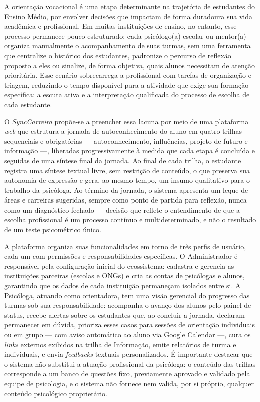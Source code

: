 A orientação vocacional é uma etapa determinante na trajetória de estudantes do Ensino Médio, por envolver decisões que impactam de forma duradoura sua vida acadêmica e profissional. Em muitas instituições de ensino, no entanto, esse processo permanece pouco estruturado: cada psicólogo(a) escolar ou mentor(a) organiza manualmente o acompanhamento de suas turmas, sem uma ferramenta que centralize o histórico dos estudantes, padronize o percurso de reflexão proposto a eles ou sinalize, de forma objetiva, quais alunos necessitam de atenção prioritária. Esse cenário sobrecarrega a profissional com tarefas de organização e triagem, reduzindo o tempo disponível para a atividade que exige sua formação específica: a escuta ativa e a interpretação qualificada do processo de escolha de cada estudante.

O \textit{SyncCarreira} propõe-se a preencher essa lacuna por meio de uma plataforma \textit{web} que estrutura a jornada de autoconhecimento do aluno em quatro trilhas sequenciais e obrigatórias --- autoconhecimento, influências, projeto de futuro e informação ---, liberadas progressivamente à medida que cada etapa é concluída e seguidas de uma síntese final da jornada. Ao final de cada trilha, o estudante registra uma síntese textual livre, sem restrição de conteúdo, o que preserva sua autonomia de expressão e gera, ao mesmo tempo, um insumo qualitativo para o trabalho da psicóloga. Ao término da jornada, o sistema apresenta um leque de áreas e carreiras sugeridas, sempre como ponto de partida para reflexão, nunca como um diagnóstico fechado --- decisão que reflete o entendimento de que a escolha profissional é um processo contínuo e multideterminado, e não o resultado de um teste psicométrico único.

A plataforma organiza suas funcionalidades em torno de três perfis de usuário, cada um com permissões e responsabilidades específicas. O Administrador é responsável pela configuração inicial do ecossistema: cadastra e gerencia as instituições parceiras (escolas e ONGs) e cria as contas de psicólogas e alunos, garantindo que os dados de cada instituição permaneçam isolados entre si. A Psicóloga, atuando como orientadora, tem uma visão gerencial do progresso das turmas sob sua responsabilidade: acompanha o avanço dos alunos pelo painel de status, recebe alertas sobre os estudantes que, ao concluir a jornada, declaram permanecer em dúvida, prioriza esses casos para sessões de orientação individuais ou em grupo --- com aviso automático ao aluno via Google Calendar ---, cura os \textit{links} externos exibidos na trilha de Informação, emite relatórios de turma e individuais, e envia \textit{feedbacks} textuais personalizados. É importante destacar que o sistema não substitui a atuação profissional da psicóloga: o conteúdo das trilhas corresponde a um banco de questões fixo, previamente aprovado e validado pela equipe de psicologia, e o sistema não fornece nem valida, por si próprio, qualquer conteúdo psicológico proprietário.

